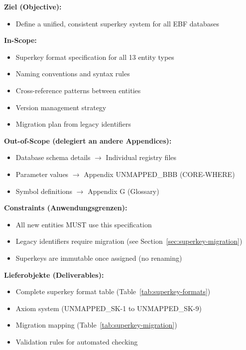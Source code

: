 \begin{tcolorbox}[
    colback=orange!5!white,
    colframe=orange!75!black,
    title={\textbf{Appendix Scope: Ziel / In-Scope / Out-of-Scope / Constraints}},
    fonttitle=\bfseries
]

\textbf{Ziel (Objective):}
\begin{itemize}[nosep]
    \item Define a unified, consistent superkey system for all EBF databases
\end{itemize}

\textbf{In-Scope:}
\begin{itemize}[nosep]
    \item Superkey format specification for all 13 entity types
    \item Naming conventions and syntax rules
    \item Cross-reference patterns between entities
    \item Version management strategy
    \item Migration plan from legacy identifiers
\end{itemize}

\textbf{Out-of-Scope (delegiert an andere Appendices):}
\begin{itemize}[nosep]
    \item Database schema details $\rightarrow$ Individual registry files
    \item Parameter values $\rightarrow$ Appendix UNMAPPED_BBB (CORE-WHERE)
    \item Symbol definitions $\rightarrow$ Appendix G (Glossary)
\end{itemize}

\textbf{Constraints (Anwendungsgrenzen):}
\begin{itemize}[nosep]
    \item All new entities MUST use this specification
    \item Legacy identifiers require migration (see Section~\ref{sec:superkey-migration})
    \item Superkeys are immutable once assigned (no renaming)
\end{itemize}

\textbf{Lieferobjekte (Deliverables):}
\begin{itemize}[nosep]
    \item Complete superkey format table (Table~\ref{tab:superkey-formats})
    \item Axiom system (UNMAPPED_SK-1 to UNMAPPED_SK-9)
    \item Migration mapping (Table~\ref{tab:superkey-migration})
    \item Validation rules for automated checking
\end{itemize}

\end{tcolorbox}


